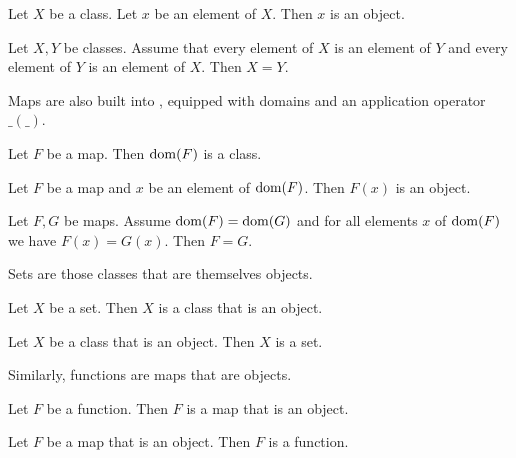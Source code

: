 \documentclass{article}
\begin{document}
\begin{forthel}
\begin{proposition}
Let $X$ be a class. Let $x$ be an element of $X$.
Then $x$ is an object.
\end{proposition}

\begin{lemma}
    Let $X, Y$ be classes.
    Assume that every element of $X$ is an element of $Y$ and every element of
    $Y$ is an element of $X$.
    Then $X = Y$.
\end{lemma}

\end{forthel}

Maps are also built into \Naproche{}, equipped with
domains and an application operator $\_ ( \_ )$.

\begin{forthel}
  \begin{lemma}
    Let $F$ be a map.
    Then $\operatorname{dom}(F)$ is a class.
  \end{lemma}

  \begin{lemma}
    Let $F$ be a map and $x$ be an element of $\operatorname{dom}(F)$.
    Then $F(x)$ is an object.
  \end{lemma}

  \begin{lemma}
    Let $F, G$ be maps.
    Assume $\operatorname{dom}(F) = \operatorname{dom}(G)$ and for all elements $x$ of $\operatorname{dom}(F)$ we have
    $F(x) = G(x)$.
    Then $F = G$.
  \end{lemma}
\end{forthel}

Sets are those classes that are themselves objects.

\begin{forthel}
  \begin{lemma}
    Let $X$ be a set.
    Then $X$ is a class that is an object.
  \end{lemma}

  \begin{lemma}
    Let $X$ be a class that is an object.
    Then $X$ is a set.
  \end{lemma}
\end{forthel}
%
Similarly, functions are maps that are objects.
\begin{forthel}
  \begin{lemma}
    Let $F$ be a function.
    Then $F$ is a map that is an object.
  \end{lemma}

  \begin{lemma}
    Let $F$ be a map that is an object.
    Then $F$ is a function.
  \end{lemma}
\end{forthel}
\end{document}

